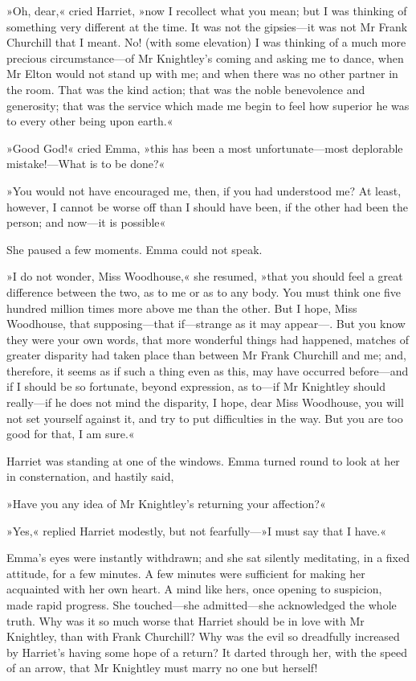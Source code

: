 »Oh, dear,« cried Harriet, »now I recollect what you mean; but I was thinking of something very different at the time. It was not the gipsies—it was not Mr Frank Churchill that I meant. No! (with some elevation) I was thinking of a much more precious circumstance—of Mr Knightley's coming and asking me to dance, when Mr Elton would not stand up with me; and when there was no other partner in the room. That was the kind action; that was the noble benevolence and generosity; that was the service which made me begin to feel how superior he was to every other being upon earth.«

»Good God!« cried Emma, »this has been a most unfortunate—most deplorable mistake!—What is to be done?«

»You would not have encouraged me, then, if you had understood me? At least, however, I cannot be worse off than I should have been, if the other had been the person; and now—it is possible\longdash«

She paused a few moments. Emma could not speak.

»I do not wonder, Miss Woodhouse,« she resumed, »that you should feel a great difference between the two, as to me or as to any body. You must think one five hundred million times more above me than the other. But I hope, Miss Woodhouse, that supposing—that if—strange as it may appear—. But you know they were your own words, that more wonderful things had happened, matches of greater disparity had taken place than between Mr Frank Churchill and me; and, therefore, it seems as if such a thing even as this, may have occurred before—and if I should be so fortunate, beyond expression, as to—if Mr Knightley should really—if he does not mind the disparity, I hope, dear Miss Woodhouse, you will not set yourself against it, and try to put difficulties in the way. But you are too good for that, I am sure.«

Harriet was standing at one of the windows. Emma turned round to look at her in consternation, and hastily said,

»Have you any idea of Mr Knightley's returning your affection?«

»Yes,« replied Harriet modestly, but not fearfully—»I must say that I have.«

Emma's eyes were instantly withdrawn; and she sat silently meditating, in a fixed attitude, for a few minutes. A few minutes were sufficient for making her acquainted with her own heart. A mind like hers, once opening to suspicion, made rapid progress. She touched—she admitted—she acknowledged the whole truth. Why was it so much worse that Harriet should be in love with Mr Knightley, than with Frank Churchill? Why was the evil so dreadfully increased by Harriet's having some hope of a return? It darted through her, with the speed of an arrow, that Mr Knightley must marry no one but herself!


